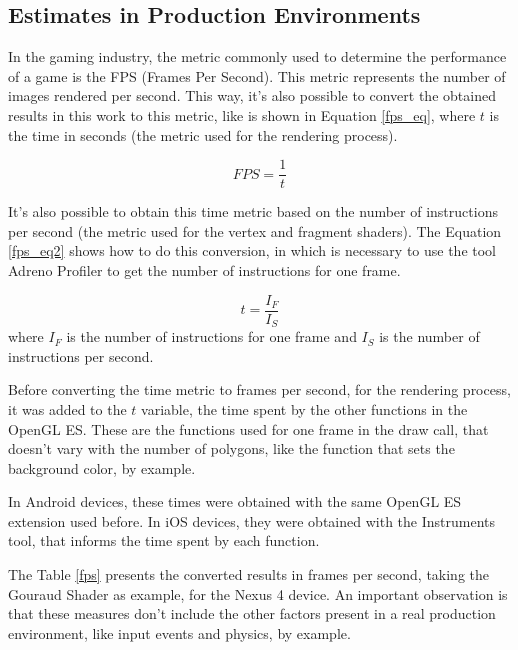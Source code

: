 \documentclass[10pt, conference, compsocconf]{IEEEtran}
\begin{document}
{\subsection{Estimates in Production Environments}

In the gaming industry, the metric commonly used to determine the 
performance of a game is the FPS (Frames Per Second). This metric 
represents the number of images rendered per second. This way,
it's also possible to convert the obtained results in this work 
to this metric, like is shown in Equation \ref{fps_eq},
where $t$ is the time in seconds (the metric used for the rendering process).

	\begin{equation}
		FPS = \frac{1} {t}
	\label{fps_eq}
	\end{equation}
	
It's also possible to obtain this time metric based on the number of instructions
per second (the metric used for the vertex and fragment shaders). The Equation \ref{fps_eq2} shows how to do this conversion, in which is necessary
to use the tool Adreno Profiler to get the number of instructions for one
frame.

	\begin{equation}
		t = \frac{I_F} {I_S}
	\label{fps_eq2}
	\end{equation}
	where $I_{F}$ is the number of instructions for one frame and 
$I_{S}$  is the number of instructions per second.

Before converting the time metric to frames per second, for the rendering process,
it was added to the $t$ variable, the time spent by the other functions
in the OpenGL ES. These are the functions used for one frame in the draw call,
that doesn't vary with the number of polygons, like the function that sets the
background color, by example. 

In Android devices, these times were 
obtained with the same OpenGL ES extension used before. In iOS devices, they
were obtained with the Instruments tool, that informs the time spent by
each function.

The Table \ref{fps} presents the converted results in frames per second, 
taking the Gouraud Shader as example, for the Nexus 4 device. An important
observation is that these measures don't include the other factors present
in a real production environment, like input events and physics, by example.

}
\end{document}
